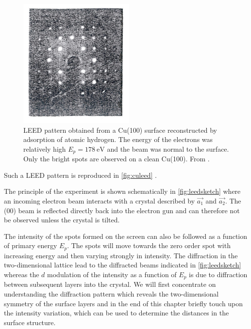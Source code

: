 \begin{figure}[h!]
	\begin{center}
	\includegraphics[scale=4]{figures/09_06.png}
	\caption{LEED pattern obtained from a Cu(100) surface reconstructed by adsorption of atomic hydrogen. The energy of the electrons was relatively high $E_p=\SI{178}{\electronvolt}$ and the beam was  normal to the surface. Only the bright spots are observed on a clean Cu(100). From \cite{HonCu}.}
	\label{fig:culeed}
	\end{center}
\end{figure}

Such a LEED pattern is reproduced in \autoref{fig:culeed} \cite{HonCu}.

The principle of the experiment is shown schematically in \autoref{fig:leedsketch} where an incoming electron beam interacts with a crystal described by $\vec{a_1}$ and $\vec{a_2}$. The (00) beam is reflected directly back into the electron gun and can therefore not be observed unless  the crystal is tilted.

The intensity of the spots formed on the screen can also be followed as a function of primary energy $E_p$. The spots will move towards the zero order spot with increasing energy and then varying strongly in intensity. The diffraction in the two-dimensional lattice lead to the diffracted beams indicated in \autoref{fig:leedsketch} whereas the $d$ modulation of the intensity as a function of $E_p$ is due to diffraction between subsequent layers into the crystal. We will first concentrate on understanding the diffraction pattern which reveals the two-dimensional symmetry of the surface layers and in the end of this chapter  briefly touch upon the intensity variation, which can be used to determine the distances in the surface structure.

